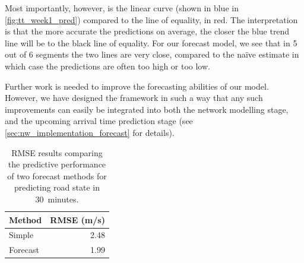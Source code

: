 Most importantly, however, is the linear curve (shown in blue in \cref{fig:tt_week1_pred}) compared to the line of equality, in red. The interpretation is that the more accurate the predictions on average, the closer the blue trend line will be to the black line of equality. For our forecast model, we see that in 5 out of 6 segments the two lines are very close, compared to the na\"ive estimate in which case the predictions are often too high or too low.


Further work is needed to improve the forecasting abilities of our model. However, we have designed the framework in such a way that any such improvements can easily be integrated into both the network modelling stage, and the upcoming arrival time prediction stage (see \cref{sec:nw_implementation_forecast} for details).

\begin{table}

\caption{\label{tab:tt_pred_rmse}RMSE results comparing the predictive performance of two forecast methods for predicting road state in 30~minutes.}
\centering
\begin{tabular}[t]{lr}
\toprule
Method & RMSE (m/s)\\
\midrule
Simple & 2.48\\
Forecast & 1.99\\
\bottomrule
\end{tabular}
\end{table}





